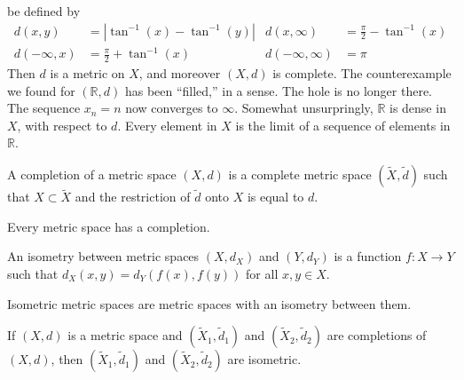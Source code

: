             be defined by
            \begin{align*}
                d(x,y)
                &=|\tan^{-1}(x)-\tan^{-1}(y)|
                &
                d(x,\infty)
                &=\frac{\pi}{2}-\tan^{-1}(x)\\
                d(-\infty,x)
                &=\frac{\pi}{2}+\tan^{-1}(x)
                &
                d(-\infty,\infty)&=\pi
            \end{align*}
            Then $d$ is a metric on $X$, and moreover
            $(X,d)$ is complete. The counterexample
            we found for $(\mathbb{R},d)$ has been
            ``filled,'' in a sense. The hole is
            no longer there. The sequence $x_{n}=n$
            now converges to $\infty$. Somewhat
            unsurpringly, $\mathbb{R}$ is
            dense in $X$, with respect to
            $d$. Every element in $X$ is the limit of
            a sequence of elements in $\mathbb{R}$.
            \begin{definition}
                A completion of a metric space
                $(X,d)$ is a complete metric space
                $(\tilde{X},\tilde{d})$ such that
                $X\subset{\tilde{X}}$ and
                the restriction of
                $\tilde{d}$ onto $X$ is equal to $d$.
            \end{definition}
            \begin{theorem}
                Every metric space has a completion.
            \end{theorem}
            \begin{definition}
                An isometry between
                metric spaces
                $(X,d_{X})$ and
                $(Y,d_{Y})$ is a function
                $f:X\rightarrow{Y}$ such that
                $d_{X}(x,y)=d_{Y}(f(x),f(y))$
                for all $x,y\in{X}$.
            \end{definition}
            \begin{definition}
                Isometric metric spaces are metric spaces
                with an isometry between them.
            \end{definition}
            \begin{theorem}
                If $(X,d)$ is a metric space
                and $(\tilde{X}_{1},\tilde{d}_{1})$
                and $(\tilde{X}_{2},\tilde{d}_{2})$
                are completions of $(X,d)$, then
                $(\tilde{X}_{1},\tilde{d}_{1})$
                and $(\tilde{X}_{2},\tilde{d}_{2})$
                are isometric.
            \end{theorem}
